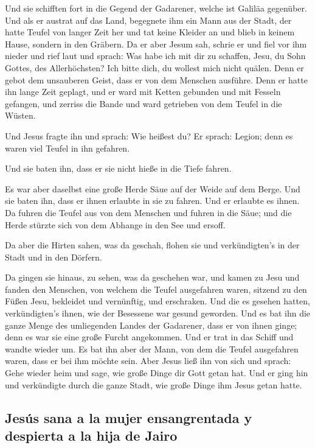  Und sie schifften fort in die Gegend der Gadarener,
welche ist Galiläa gegenüber.  Und als er austrat auf das
Land, begegnete ihm ein Mann aus der Stadt, der hatte Teufel von langer
Zeit her und tat keine Kleider an und blieb in keinem Hause, sondern in
den Gräbern.  Da er aber Jesum sah, schrie er und fiel
vor ihm nieder und rief laut und sprach: Was habe ich mit dir zu
schaffen, Jesu, du Sohn Gottes, des Allerhöchsten? Ich bitte dich, du
wollest mich nicht quälen.  Denn er gebot dem unsauberen
Geist, dass er von dem Menschen ausführe. Denn er hatte ihn lange Zeit
geplagt, und er ward mit Ketten gebunden und mit Fesseln gefangen, und
zerriss die Bande und ward getrieben von dem Teufel in die Wüsten.

 Und Jesus fragte ihn und sprach: Wie heißest du? Er
sprach: Legion; denn es waren viel Teufel in ihn gefahren.

 Und sie baten ihn, dass er sie nicht hieße in die Tiefe
fahren.

 Es war aber daselbst eine große Herde Säue auf der Weide
auf dem Berge. Und sie baten ihn, dass er ihnen erlaubte in sie zu
fahren. Und er erlaubte es ihnen.  Da fuhren die Teufel
aus von dem Menschen und fuhren in die Säue; und die Herde stürzte sich
von dem Abhange in den See und ersoff.

 Da aber die Hirten sahen, was da geschah, flohen sie und
verkündigten's in der Stadt und in den Dörfern.

 Da gingen sie hinaus, zu sehen, was da geschehen war,
und kamen zu Jesu und fanden den Menschen, von welchem die Teufel
ausgefahren waren, sitzend zu den Füßen Jesu, bekleidet und vernünftig,
und erschraken.  Und die es gesehen hatten,
verkündigten's ihnen, wie der Besessene war gesund geworden.
 Und es bat ihn die ganze Menge des umliegenden Landes
der Gadarener, dass er von ihnen ginge; denn es war sie eine große
Furcht angekommen. Und er trat in das Schiff und wandte wieder um.
 Es bat ihn aber der Mann, von dem die Teufel ausgefahren
waren, dass er bei ihm möchte sein. Aber Jesus ließ ihn von sich und
sprach:  Gehe wieder heim und sage, wie große Dinge dir
Gott getan hat. Und er ging hin und verkündigte durch die ganze Stadt,
wie große Dinge ihm Jesus getan hatte.

\hypertarget{jesuxfas-sana-a-la-mujer-ensangrentada-y-despierta-a-la-hija-de-jairo}{%
\subsection{Jesús sana a la mujer ensangrentada y despierta a la hija de
Jairo}\label{jesuxfas-sana-a-la-mujer-ensangrentada-y-despierta-a-la-hija-de-jairo}}

